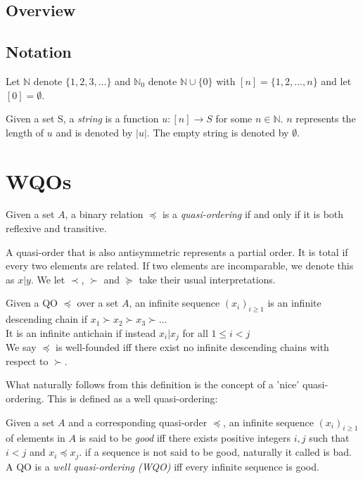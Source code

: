 \documentclass[a4paper]{article}
\begin{document}
\subsection{Overview}
\subsection{Notation}
Let $\mathbb{N}$ denote $\{1,2,3,...\}$ and $\mathbb{N}_0$ denote $\mathbb{N} \cup \{0\}$ with $[n] = \{1,2,...,n\}$ and let $[0] = \emptyset$.\\
\begin{definition}[string]
	Given a set S, a \emph{string} is a function $u:[n] \to S$ for some $n \in \mathbb{N}$. $n$ represents the length of $u$ and is denoted by $|u|$. The empty string is denoted by $\emptyset$.
\end{definition}
\section{WQOs}
\begin{definition}
	Given a set $A$, a binary relation $\preccurlyeq$ is a \emph{quasi-ordering} if and only if it is both reflexive and transitive.
\end{definition}
A quasi-order that is also antisymmetric represents a partial order. It is total if every two elements are related. If two elements are incomparable, we denote this as $x | y$. We let $\prec$, $\succ$ and $\succcurlyeq$ take their usual interpretations.
\begin{definition}
Given a QO $\preccurlyeq$ over a set $A$, an infinite sequence $(x_i)_{i \geq 1}$ is an infinite descending chain if $x_1 \succ x_2 \succ x_3 \succ ...$\\
It is an infinite antichain if instead $ x_i | x_j$ for all $1 \leq i < j$\\
We say $\preccurlyeq$ is well-founded iff there exist no infinite descending chains with respect to $\succ$.
\end{definition}

What naturally follows from this definition is the concept of a 'nice' quasi-ordering. This is defined as a well quasi-ordering:

\begin{definition} 
Given a set $A$ and a corresponding quasi-order $\preccurlyeq$, an infinite sequence $(x_i)_{i \geq 1}$ of elements in $A$ is said to be \emph{good} iff there exists positive integers $i, j$ such that $i < j$ and $x_i \preccurlyeq x_j$. if a sequence is not said to be good, naturally it called is bad.\\
A QO is a \emph{well quasi-ordering (WQO)} iff every infinite sequence is good. 
\end{definition}
\end{document}

